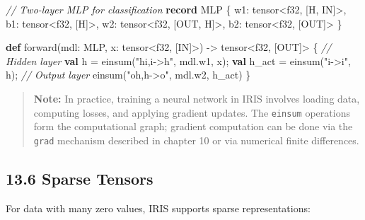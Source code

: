 \documentclass[
  english,
]{book}
\newenvironment{Shaded}{\begin{snugshade}}{\end{snugshade}}
\newcommand{\CommentTok}[1]{\textcolor[rgb]{0.42,0.60,0.33}{\textit{#1}}}
\newcommand{\DataTypeTok}[1]{\textcolor[rgb]{0.31,0.79,0.69}{#1}}
\newcommand{\FunctionTok}[1]{\textcolor[rgb]{0.86,0.86,0.67}{#1}}
\newcommand{\KeywordTok}[1]{\textcolor[rgb]{0.34,0.61,0.84}{\textbf{#1}}}
\newcommand{\NormalTok}[1]{\textcolor[rgb]{0.83,0.83,0.83}{#1}}
\newcommand{\OperatorTok}[1]{\textcolor[rgb]{0.83,0.83,0.83}{#1}}
\newcommand{\StringTok}[1]{\textcolor[rgb]{0.81,0.57,0.47}{#1}}
\begin{document}
\begin{Shaded}
\begin{Highlighting}[]
\CommentTok{// Two{-}layer MLP for classification}
\KeywordTok{record}\NormalTok{ MLP \{}
\NormalTok{    w1: }\DataTypeTok{tensor}\OperatorTok{\textless{}}\DataTypeTok{f32}\NormalTok{, [H, IN]}\OperatorTok{\textgreater{}}\NormalTok{,}
\NormalTok{    b1: }\DataTypeTok{tensor}\OperatorTok{\textless{}}\DataTypeTok{f32}\NormalTok{, [H]}\OperatorTok{\textgreater{}}\NormalTok{,}
\NormalTok{    w2: }\DataTypeTok{tensor}\OperatorTok{\textless{}}\DataTypeTok{f32}\NormalTok{, [OUT, H]}\OperatorTok{\textgreater{}}\NormalTok{,}
\NormalTok{    b2: }\DataTypeTok{tensor}\OperatorTok{\textless{}}\DataTypeTok{f32}\NormalTok{, [OUT]}\OperatorTok{\textgreater{}}
\NormalTok{\}}

\KeywordTok{def}\NormalTok{ forward(mdl: MLP, x: }\DataTypeTok{tensor}\OperatorTok{\textless{}}\DataTypeTok{f32}\NormalTok{, [IN]}\OperatorTok{\textgreater{}}\NormalTok{) }\OperatorTok{{-}\textgreater{}} \DataTypeTok{tensor}\OperatorTok{\textless{}}\DataTypeTok{f32}\NormalTok{, [OUT]}\OperatorTok{\textgreater{}}\NormalTok{ \{}
    \CommentTok{// Hidden layer}
    \KeywordTok{val}\NormalTok{ h }\OperatorTok{=} \FunctionTok{einsum}\NormalTok{(}\StringTok{"hi,i{-}\textgreater{}h"}\NormalTok{, mdl}\OperatorTok{.}\NormalTok{w1, x);}
    \KeywordTok{val}\NormalTok{ h\_act }\OperatorTok{=} \FunctionTok{einsum}\NormalTok{(}\StringTok{"i{-}\textgreater{}i"}\NormalTok{, h);}
    \CommentTok{// Output layer}
    \FunctionTok{einsum}\NormalTok{(}\StringTok{"oh,h{-}\textgreater{}o"}\NormalTok{, mdl}\OperatorTok{.}\NormalTok{w2, h\_act)}
\NormalTok{\}}
\end{Highlighting}
\end{Shaded}

\begin{quote}
\textbf{Note:} In practice, training a neural network in IRIS involves
loading data, computing losses, and applying gradient updates. The
\texttt{einsum} operations form the computational graph; gradient
computation can be done via the \texttt{grad} mechanism described in
chapter 10 or via numerical finite differences.
\end{quote}

\subsection{13.6 Sparse Tensors}\label{sparse-tensors}

For data with many zero values, IRIS supports sparse representations:
\end{document}
